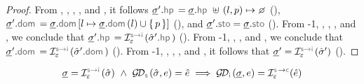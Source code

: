 \begin{proof}
 \noindent From , , , , and , it follows 
 $\istate'.\hpsel = \istate.\hpsel \dunion (\loc, p) \mapsto \none$ (), 
 $\istate'.\domsel = \istate.\domsel[\loc \mapsto \istate.\domsel(\loc) \cup \jsilset{p}]$ (), 
 and $\istate'.\stosel = \istate.\stosel$ (). 
 From \hyp{1}, ,  , , and , we conclude that $\istate'.\hpsel = \interpret{\symbinst}{\senv}(\sstate'.\hpsel)$ (). 
 From \hyp{1}, , , and , we conclude that $\istate'.\domsel =  \interpret{\symbinst}{\senv}(\sstate'.\domsel)$ (). 
 From \hyp{1}, , , , and , it follows that $\istate' = \interpret{\symbinst}{\senv}(\sstate')$ (). 
 \end{proof}


\begin{lemma}\label{lemma:getdomain:soundiness}
$$
\istate = \interpret{\symbinst}{\senv}(\sstate) \ \wedge \ 
  \absgetdomainfun{\symbolic}(\sstate, \jsilexpr) = \sexpr  
  \implies \absgetdomainfun{\instrumented}(\istate, \jsilexpr) = \interpret{\symbconc}{\senv}(\sexpr)
$$
\end{lemma}
